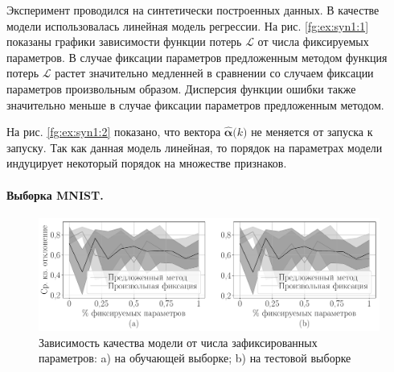 Эксперимент проводился на синтетически построенных данных. В качестве модели использовалась линейная модель регрессии.
На рис. \ref{fg:ex:syn1:1} показаны графики зависимости функции потерь $\mathcal{L}$ от числа фиксируемых параметров. В случае фиксации параметров предложенным методом функция потерь $\mathcal{L}$ растет значительно медленней в сравнении со случаем фиксации параметров произвольным образом. Дисперсия функции ошибки также значительно меньше в случае фиксации параметров предложенным методом.

На рис. \ref{fg:ex:syn1:2} показано, что вектора $\hat{\bm{\alpha}}\bigr(k\bigr)$ не меняется от запуска к запуску. Так как данная модель линейная, то порядок на параметрах модели индуцирует некоторый порядок на множестве признаков.

\paragraph{Выборка MNIST.}

\begin{figure}[h!t]\center
\includegraphics[width=1\textwidth]{results/order/mnist_data_loss}
\caption{Зависимость качества модели от числа зафиксированных параметров: a) на обучающей выборке; b) на тестовой выборке}
\label{fg:ex:mnist:1}
\end{figure}

